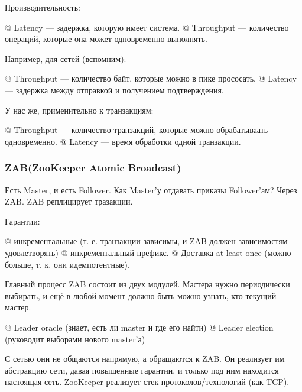 Производительность:
\begin{el}[ul]
@ Latency --- задержка, которую имеет система.
@ Throughput --- количество операций, которые она может одновременно выполнять.
\end{el}

Например, для сетей (вспомним):
\begin{el}[ul]
@ Throughput --- количество байт, которые можно в пике прососать.
@ Latency --- задержка между отправкой и получением подтверждения.
\end{el}

У нас же, применительно к транзакциям:
\begin{el}[ul]
@ Throughput --- количество транзакций, которые можно обрабатываать одновременно.
@ Latency --- время обработки одной транзакции.
\end{el}

\subsubsection{ZAB(ZooKeeper Atomic Broadcast)}
Есть Master, и есть Follower. Как Master'у отдавать приказы Follower'ам? Через ZAB.
ZAB реплицирует тразакции.

Гарантии:
\begin{el}[ol]
@ инкрементальные (т. е. транзакции зависимы, и ZAB должен зависимостям удовлетворять)
@ инкрементальный префикс.
@ Доставка at least once (можно больше, т. к. они идемпотентные).
\end{el}

Главный процесс ZAB состоит из двух модулей. Мастера нужно периодически выбирать, и ещё в любой момент должно быть можно узнать, кто текущий мастер.
\begin{el}[ol]
@ Leader oracle (знает, есть ли master и где его найти)
@ Leader election (руководит выборами нового master'а)
\end{el}

С сетью они не общаются напрямую, а обращаются к ZAB. Он реализует им абстракцию сети, давая повышенные гарантии, и только под ним находится настоящая сеть. ZooKeeper реализует стек протоколов/технологий (как TCP).


